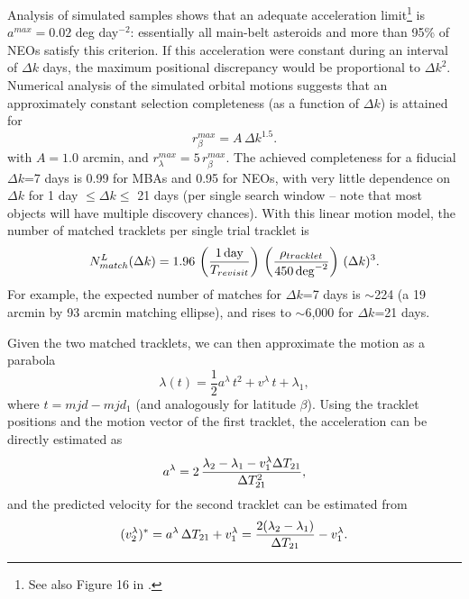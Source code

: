 Analysis of simulated samples shows that an adequate acceleration limit\footnote{See also
Figure 16 in \citet{LDM-156}.} is $a^{max}=0.02$ deg day$^{-2}$: essentially
all main-belt asteroids and more than 95\% of NEOs satisfy this criterion. If this acceleration
were constant during an interval of $\Delta k$ days, the maximum positional discrepancy
would be proportional to $\Delta k^2$. Numerical analysis of the simulated orbital motions
suggests that an approximately constant selection completeness (as a function of $\Delta k$)
is attained for
\begin{equation}
\label{eq:matching1}
                r_\beta^{max} = A \, \Delta k^{1.5}.
\end{equation}
with $A=1.0$ arcmin, and $r_\lambda^{max} = 5 \, r_\beta^{max}$. The achieved completeness for
a fiducial $\Delta k$=7 days is 0.99 for MBAs and 0.95 for NEOs, with very little dependence
on $\Delta k$ for 1 day $\le \Delta k \le$ 21 days (per single search window -- note that most
objects will have multiple discovery chances).  With this linear motion model, the number
of matched tracklets per single trial tracklet is
\begin{equation}
\label{eq:Nmdk2}
   N^{L}_{match}(\Delta k) = 1.96 \, \left({1 \, {\rm day} \over T_{revisit}}\right) \,
                    \left( \rho_{tracklet}  \over 450 \, {\rm deg}^{-2} \right) \, (\Delta k)^3.
\end{equation}
For example,  the expected number of matches for $\Delta k$=7 days is $\sim$224
(a 19 arcmin by 93 arcmin matching ellipse), and rises to $\sim$6,000 for
$\Delta k$=21 days.

Given the two matched tracklets, we can then approximate the motion as a parabola
\begin{equation}
\label{eq:parabola}
          \lambda(t) = \frac{1}{2}a^\lambda \, t^2 + v^\lambda \, t + \lambda_1,
\end{equation}
where $t = mjd - mjd_1$ (and analogously for latitude $\beta$).  Using the tracklet
positions and the motion vector of the first tracklet, the acceleration can be directly
estimated as
\begin{equation}
 \label{eq:accPred}
             a^\lambda = 2 \, {\lambda_2- \lambda_1 - v_1^\lambda \Delta T_{21} \over \Delta T^2_{21}},
\end{equation}
and the predicted velocity for the second tracklet can be estimated from
\begin{equation}
\label{eq:v2cut}
        (v^\lambda_2)^\ast =  a^\lambda \,\Delta T_{21}  + v_1^\lambda =
      {2(\lambda_2- \lambda_1) \over \Delta T_{21}}  - v_1^\lambda.
\end{equation}

